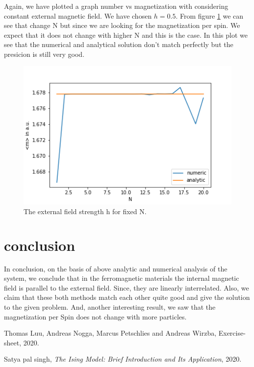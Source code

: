 \documentclass[11pt, a4paper, DIV=12]{scrartcl}
\begin{document}
Again, we have plotted a graph number vs magnetization with considering constant external magnetic field. We have chosen $h= 0.5$. From figure \ref{fig:hconst} we can see that change N but since we are looking for the magnetization per spin. We expect that it does not change with higher N and this is the case. In this plot we see that the numerical and analytical solution don't match perfectly but the presicion is still very good. 
   \begin{figure}[H]
   	\centering
   	\includegraphics[width=0.8\linewidth]{hconst.png}
   	\caption{The external field strength h for fixed N.}
   	\label{fig:hconst}
   \end{figure}
\section{conclusion}
In conclusion, on the basis of above analytic and numerical analysis of the system, we conclude that in the ferromagnetic materials the internal magnetic field is parallel to the external field. Since, they are linearly interrelated. Also, we claim that these both methods match each other quite good and give the solution to the given problem. And, another interesting result, we saw that the magnetization per Spin does not change with more particles.  
\begin{thebibliography}{12}
	Thomas Luu, Andreas Nogga, Marcus Petschlies and  Andreas Wirzba, Exercise-sheet, 2020. 
		
	Satya pal singh, \textit{The Ising Model: Brief Introduction and Its Application}, 2020.
	
\end{thebibliography}
\end{document}
